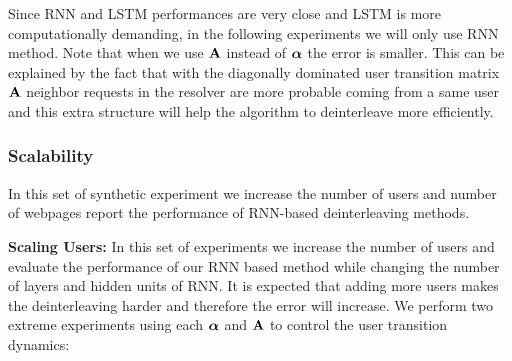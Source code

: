 \documentclass[conference]{IEEEtran}
\begin{document}
	
	Since RNN and LSTM performances are very close and LSTM is more computationally demanding, in the following experiments we will only use RNN method. 
	Note that when we use $\mathbf{A}$ instead of $\boldsymbol{\alpha}$ the error is smaller. 
	This can be explained by the fact that with the diagonally dominated user transition matrix $\mathbf{A}$ neighbor requests in the resolver are more probable coming from a same user and this extra structure will help the algorithm to deinterleave more efficiently. 
	
	
	
	\subsubsection{Scalability}
	In this set of synthetic experiment we increase the number of users and number of webpages report the performance of RNN-based deinterleaving methods. 

	{\bf Scaling Users:}
	\label{subsub:scalseusr}
	In this set of experiments we increase the number of users and evaluate the performance of our RNN based method while changing the number of layers and hidden units of RNN. 
	It is expected that adding more users makes the deinterleaving harder and therefore the error will increase. 
	We perform two extreme experiments using each $\boldsymbol{\alpha}$ and $\mathbf{A}$ to control the user transition dynamics: 
	
\end{document}
